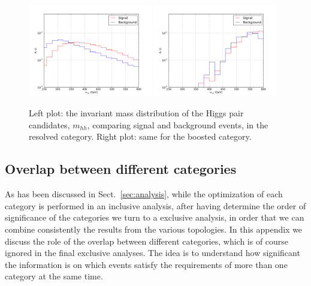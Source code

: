 \begin{figure}[t]
\begin{center}
  \includegraphics[width=0.48\textwidth]{plots/m_HH_res_C1.pdf}
  \includegraphics[width=0.48\textwidth]{plots/m_HH_boost_C1.pdf}
  \caption{\small Left plot: the invariant mass distribution of the Higgs
    pair candidates, $m_{hh}$, comparing signal and background events,
    in the resolved category.
    Right plot: same for the boosted category.
}
\label{fig:mhh}
\end{center}
\end{figure}






\subsection{Overlap between different categories}
\label{sec:overlap}

As has been discussed in Sect.~\ref{sec:analysis}, while the optimization of each
category is performed in an inclusive analysis, after having determine the order
of significance of the categories we turn to a exclusive analysis, in order that
we can combine consistently the results from the various topologies.
%
In this appendix we discuss the role of the overlap
between  different categories, which is of course ignored in the final exclusive
analyses.
%
The idea is to understand how significant the information is on which events satisfy the requirements
of more than one category at the same time.

